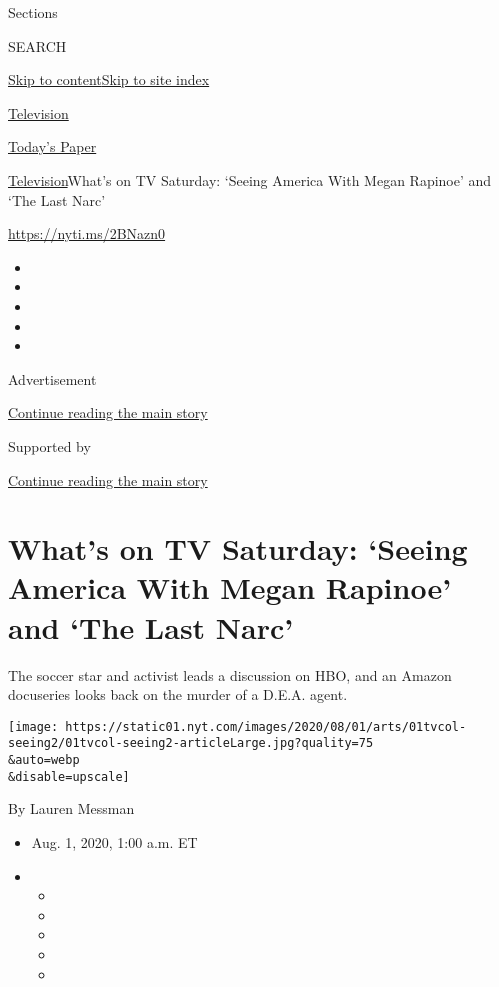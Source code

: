 Sections

SEARCH

\protect\hyperlink{site-content}{Skip to
content}\protect\hyperlink{site-index}{Skip to site index}

\href{https://www.nytimes.com/section/arts/television}{Television}

\href{https://myaccount.nytimes.com/auth/login?response_type=cookie\&client_id=vi}{}

\href{https://www.nytimes.com/section/todayspaper}{Today's Paper}

\href{/section/arts/television}{Television}\textbar{}What's on TV
Saturday: `Seeing America With Megan Rapinoe' and `The Last Narc'

\url{https://nyti.ms/2BNazn0}

\begin{itemize}
\item
\item
\item
\item
\item
\end{itemize}

Advertisement

\protect\hyperlink{after-top}{Continue reading the main story}

Supported by

\protect\hyperlink{after-sponsor}{Continue reading the main story}

\hypertarget{whats-on-tv-saturday-seeing-america-with-megan-rapinoe-and-the-last-narc}{%
\section{What's on TV Saturday: `Seeing America With Megan Rapinoe' and
`The Last
Narc'}\label{whats-on-tv-saturday-seeing-america-with-megan-rapinoe-and-the-last-narc}}

The soccer star and activist leads a discussion on HBO, and an Amazon
docuseries looks back on the murder of a D.E.A. agent.

\texttt{[image: https://static01.nyt.com/images/2020/08/01/arts/01tvcol-seeing2/01tvcol-seeing2-articleLarge.jpg?quality=75\\\&auto=webp\\\&disable=upscale]}

By Lauren Messman

\begin{itemize}
\item
  Aug. 1, 2020, 1:00 a.m. ET
\item
  \begin{itemize}
  \item
  \item
  \item
  \item
  \item
  \end{itemize}
\end{itemize}

